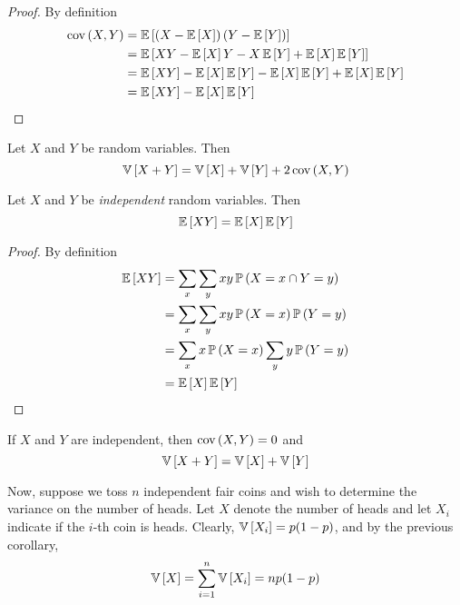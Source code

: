 \begin{proof}
    By definition
    \begin{align*}\covariance{X}{Y}
        &= \expectation{\left(X - \expectation{X}\right)\left(Y - \expectation{Y}\right)}\\
        &= \expectation{XY - \expectation{X}Y - X\expectation{Y} + \expectation{X}\expectation{Y}}\\
        &= \expectation{XY} - \expectation{X}\expectation{Y} - \expectation{X}\expectation{Y} + \expectation{X}\expectation{Y}\\
        &= \expectation{XY} - \expectation{X}\expectation{Y}\qedhere
    \end{align*}
\end{proof}

\begin{corollary}{}{}
    Let $X$ and $Y$ be random variables. Then
    \[\variance{X + Y} = \variance{X} + \variance{Y} + 2\covariance{X}{Y}\]
\end{corollary}

\begin{theorem}{}{}
    Let $X$ and $Y$ be \emph{independent} random variables. Then
    \[\expectation{XY} = \expectation{X}\expectation{Y}\] 
\end{theorem}

\begin{proof}
    By definition
    \begin{align*}\expectation{XY}
        &= \sum_{x}\sum_{y} xy\prob{X = x \cap Y = y}\\
        &= \sum_{x}\sum_{y} xy\prob{X = x} \prob{Y = y}\\
        &= \sum_{x}x\prob{X = x}\sum_{y}y\prob{Y = y}\\
        &= \expectation{X}\expectation{Y}\qedhere
    \end{align*}
\end{proof}

\begin{corollary}{}{}
    If $X$ and $Y$ are independent, then $\covariance{X}{Y} = 0$ and
    \[\variance{X + Y} = \variance{X} + \variance{Y}\]
\end{corollary}

Now, suppose we toss $n$ independent fair coins and wish to determine the
variance on the number of heads. Let $X$ denote the number of heads and let
$X_i$ indicate if the $i$-th coin is heads. Clearly, $\variance{X_i} = p(1 -
p)$, and by the previous corollary,
\[\variance{X} = \sum_{i = 1}^n \variance{X_i} = np(1 - p)\]